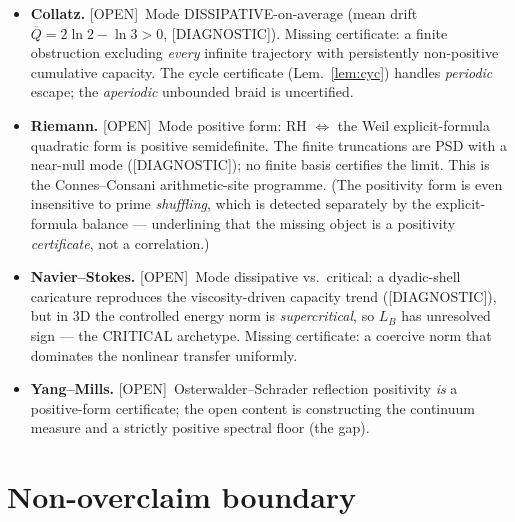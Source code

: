 \documentclass[11pt]{article}
\theoremstyle{definition}
\theoremstyle{plain}
\theoremstyle{remark}
\newcommand{\DIAG}{\textcolor{blue!55!black}{\textsf{[DIAGNOSTIC]}}}
\newcommand{\OPEN}{\textcolor{red!65!black}{\textsf{[OPEN]}}}
\begin{document}
\begin{itemize}[leftmargin=1.4em]
\item \textbf{Collatz.} \OPEN\ Mode \textsf{DISSIPATIVE-on-average} (mean drift
$\overline Q=2\ln2-\ln3>0$, \DIAG). Missing certificate: a finite obstruction excluding
\emph{every} infinite trajectory with persistently non-positive cumulative capacity.
The cycle certificate (Lem.~\ref{lem:cyc}) handles \emph{periodic} escape; the
\emph{aperiodic} unbounded braid is uncertified.
\item \textbf{Riemann.} \OPEN\ Mode \textsf{positive form}: RH $\Leftrightarrow$ the
Weil explicit-formula quadratic form is positive semidefinite. The finite truncations
are PSD with a near-null mode (\DIAG); no finite basis certifies the limit. This is the
Connes--Consani arithmetic-site programme. (The positivity form is even insensitive to
prime \emph{shuffling}, which is detected separately by the explicit-formula balance ---
underlining that the missing object is a positivity \emph{certificate}, not a
correlation.)
\item \textbf{Navier--Stokes.} \OPEN\ Mode \textsf{dissipative vs.\ critical}: a
dyadic-shell caricature reproduces the viscosity-driven capacity trend (\DIAG), but in
3D the controlled energy norm is \emph{supercritical}, so $L_B$ has unresolved sign ---
the \textsf{CRITICAL} archetype. Missing certificate: a coercive norm that dominates the
nonlinear transfer uniformly.
\item \textbf{Yang--Mills.} \OPEN\ Osterwalder--Schrader reflection positivity \emph{is}
a positive-form certificate; the open content is constructing the continuum measure and
a strictly positive spectral floor (the gap).
\end{itemize}

\section{Non-overclaim boundary}
\end{document}
